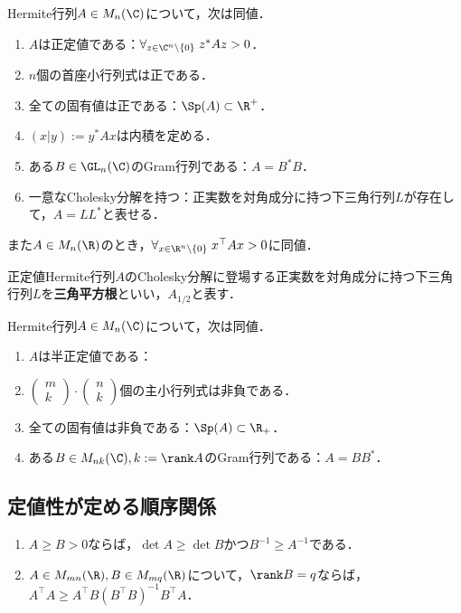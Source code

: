 \documentclass[uplatex, dvipdfmx]{jsreport}
\begin{document}
\begin{theorem}[Sylvester]
    Hermite行列$A\in M_n(\C)$について，次は同値．
    \begin{enumerate}
        \item $A$は正定値である：$\forall_{z\in\C^n\setminus\{0\}}\;z^*Az>0$．
        \item $n$個の首座小行列式は正である．
        \item 全ての固有値は正である：$\Sp(A)\subset\R^+$．
        \item $(x|y):=y^*Ax$は内積を定める．
        \item ある$B\in \GL_{n}(\C)$のGram行列である：$A=B^*B$．
        \item 一意なCholesky分解を持つ：正実数を対角成分に持つ下三角行列$L$が存在して，$A=LL^*$と表せる．
    \end{enumerate}
    また$A\in M_n(\R)$のとき，$\forall_{x\in\R^n\setminus\{0\}}\;x^\top Ax>0$に同値．
\end{theorem}

\begin{definition}
    正定値Hermite行列$A$のCholesky分解に登場する正実数を対角成分に持つ下三角行列$L$を\textbf{三角平方根}といい，$A_{1/2}$と表す．
\end{definition}

\begin{theorem}
    Hermite行列$A\in M_n(\C)$について，次は同値．
    \begin{enumerate}
        \item $A$は半正定値である：
        \item $\begin{pmatrix}m\\k\end{pmatrix}\cdot \begin{pmatrix}n\\k\end{pmatrix}$個の主小行列式は非負である．
        \item 全ての固有値は非負である：$\Sp(A)\subset\R_+$．
        \item ある$B\in M_{nk}(\C),k:=\rank A$のGram行列である：$A=BB^*$．
    \end{enumerate}
\end{theorem}

\subsection{定値性が定める順序関係}

\begin{proposition}\mbox{}
    \begin{enumerate}
        \item $A\ge B>0$ならば，$\det A\ge\det B$かつ$B^{-1}\ge A^{-1}$である．
        \item $A\in M_{mn}(\R),B\in M_{mq}(\R)$について，$\rank B=q$ならば，$A^\top A\ge A^\top B(B^\top B)^{-1}B^\top A$．
    \end{enumerate}
\end{proposition}
\end{document}
